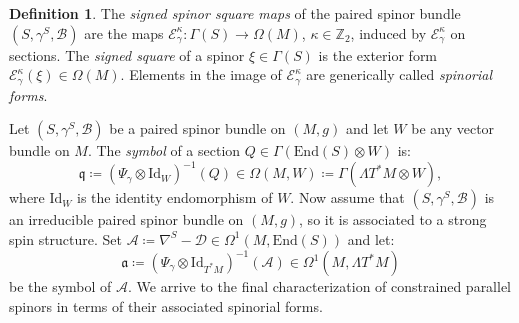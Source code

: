 \documentclass[10pt,reqno]{amsart}
\theoremstyle{definition}
\newtheorem{definition}[theorem]{Definition}
\theoremstyle{remark}
\newcommand{\Z}{\mathbb{Z}}
\newcommand{\Id}{\mathrm{Id}}
\newcommand{\End}{\mathrm{End}}
\begin{document}
\begin{definition}
    The \emph{signed spinor square maps} of the paired spinor bundle $(S,\gamma^S,\mathscr{B})$ are the maps $\mathcal{E}^\kappa_\gamma\colon\Gamma(S)\to\Omega(M)$, $\kappa\in\Z_2$, induced by $\mathcal{E}^\kappa_\gamma$ on sections. The \emph{signed square} of a spinor $\xi\in\Gamma(S)$ is the exterior form $\mathcal{E}^\kappa_\gamma(\xi)\in\Omega(M)$. Elements in the image of $\mathcal{E}^\kappa_\gamma$ are generically called \emph{spinorial forms}.
\end{definition}

Let $(S,\gamma^S,\mathscr{B})$ be a paired spinor bundle on $(M,g)$ and let $W$ be any vector bundle on $M$. The \emph{symbol} of a section $Q\in\Gamma(\End(S)\otimes W)$ is: $$\mathfrak{q}\coloneqq(\Psi_\gamma\otimes\Id_W)^{-1}(Q)\in\Omega(M,W)\coloneqq\Gamma(\Lambda T^*M\otimes W),$$ where $\Id_W$ is the identity endomorphism of $W$. Now assume that $(S,\gamma^S,\mathscr{B})$ is an irreducible paired spinor bundle on $(M,g)$, so it is associated to a strong spin structure. Set $\mathcal{A}\coloneqq\nabla^S-\mathcal{D}\in\Omega^1(M,\End(S))$ and let: $$\mathfrak{a}\coloneqq(\Psi_\gamma\otimes\Id_{T^*M})^{-1}(\mathcal{A})\in\Omega^1(M,\Lambda T^*M)$$ be the symbol of $\mathcal{A}$. We arrive to the final characterization of constrained parallel spinors in terms of their associated spinorial forms.
\end{document}
